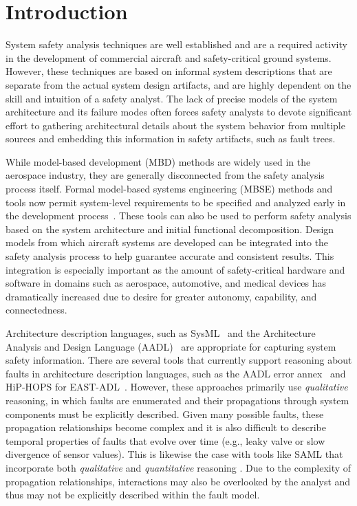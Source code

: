 \section{Introduction}

System safety analysis techniques are well established and are a required activity in the development of commercial aircraft and safety-critical ground systems. However, these techniques are based on informal system descriptions that are separate from the actual system design artifacts, and are highly dependent on the skill and intuition of a safety analyst. The lack of precise models of the system architecture and its failure modes often forces safety analysts to devote significant effort to gathering architectural details about the system behavior from multiple sources and embedding this information in safety artifacts, such as fault trees.

While model-based development (MBD) methods are widely used in the aerospace industry, they are generally disconnected from the safety analysis process itself. Formal model-based systems engineering (MBSE) methods and tools now permit system-level requirements to be specified and analyzed early in the development process~\cite{QFCS15:backes,hilt2013,NFM2012:CoGaMiWhLaLu,DBLP:journals/scp/CimattiT15,Pajic2012,DBLP:conf/adaEurope/SokolskyLC09}. These tools can also be used to perform safety analysis based on the system architecture and initial functional decomposition. Design models from which aircraft systems are developed can be integrated into the safety analysis process to help guarantee accurate and consistent results. This integration is especially important as the amount of safety-critical hardware and software in domains such as aerospace, automotive, and medical devices has dramatically increased due to desire for greater autonomy, capability, and connectedness.

Architecture description languages, such as SysML~\cite{SysML} and the Architecture Analysis and Design Language (AADL)~\cite{AADL} are appropriate for capturing system safety information.  There are several tools that currently support reasoning about faults in architecture description languages, such as the AADL error annex~\cite{Larson:2013:IAE:2527269.2527271} and HiP-HOPS for EAST-ADL~\cite{CHEN201391}.  However, these approaches primarily use {\em qualitative} reasoning, in which faults are enumerated and their propagations through system components must be explicitly described.  Given many possible faults, these propagation relationships become complex and it is also difficult to describe temporal properties of faults that evolve over time (e.g., leaky valve or slow divergence of sensor values). This is likewise the case with tools like SAML that incorporate both \textit{qualitative} and \textit{quantitative} reasoning \cite{Gudemann:2010:FQQ:1909626.1909813}. Due to the complexity of propagation relationships, interactions may also be overlooked by the analyst and thus may not be explicitly described within the fault model.



